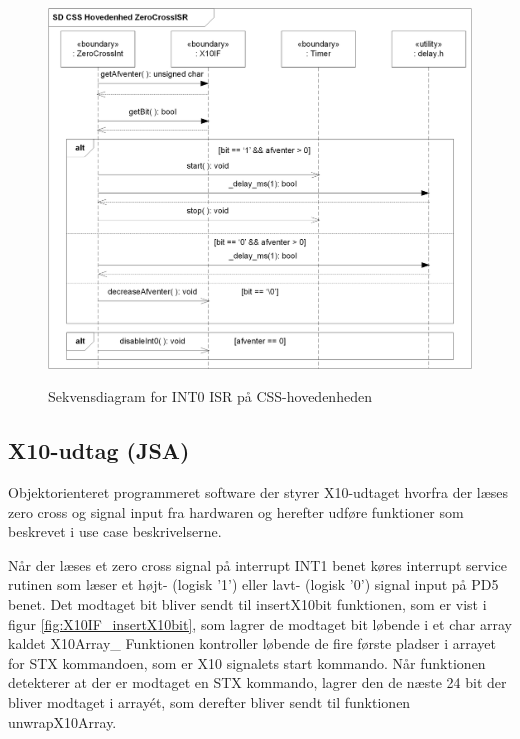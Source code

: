 \begin{figure}[!htb]
     {\includegraphics[width=\textwidth]{billeder/uml/CSS_ZeroCrossInt_SD}}
     \caption{Sekvensdiagram for INT0 ISR på CSS-hovedenheden}
     \label{fig:ZeroCrossISR}
\end{figure}

\subsection{X10-udtag (JSA)}

Objektorienteret programmeret software der styrer X10-udtaget hvorfra der læses zero cross og signal input fra hardwaren og herefter udføre funktioner som beskrevet i use case beskrivelserne.

Når der læses et zero cross signal på interrupt INT1 benet køres interrupt service rutinen som læser et højt- (logisk '1') eller lavt- (logisk '0') signal input på PD5 benet. Det modtaget bit bliver sendt til insertX10bit funktionen, som er vist i figur \ref{fig:X10IF_insertX10bit}, som lagrer de modtaget bit løbende i et char array kaldet X10Array\_ Funktionen kontroller løbende de fire første pladser i arrayet for STX kommandoen, som er X10 signalets start kommando. Når funktionen detekterer at der er modtaget en STX kommando, lagrer den de næste 24 bit der bliver modtaget i array\'et, som derefter bliver sendt til funktionen unwrapX10Array. 

